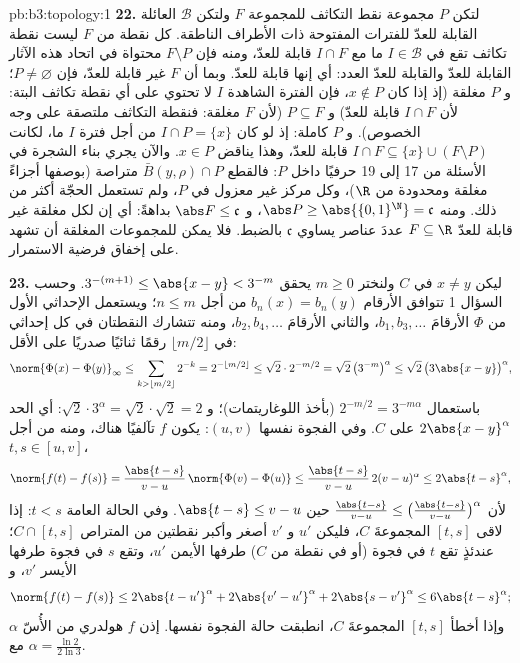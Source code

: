 \begin{solution}{pb:b3:topology:1}
\textbf{22.} لتكن $P$ مجموعة نقط التكاثف للمجموعة $F$ ولتكن
$\mathcal B$ العائلة القابلة للعدّ للفترات المفتوحة ذات الأطراف
الناطقة. كل نقطة من $F$ ليست نقطة تكاثف تقع في $I \in \mathcal B$ ما مع
$I \cap F$ قابلة للعدّ، ومنه فإن $F
\setminus P$ محتواة في اتحاد هذه الآثار
القابلة للعدّ والقابلة للعدّ العدد: أي إنها قابلة للعدّ. وبما أن $F$ غير
قابلة للعدّ، فإن $P \neq \varnothing$؛ و $P$ مغلقة (إذ إذا كان $x \notin P$، فإن
الفترة الشاهدة $I$ لا تحتوي على أي نقطة تكاثف البتة: لأن
$I \cap F$ قابلة للعدّ) و $P \subseteq F$ (لأن $F$ مغلقة: فنقطة
التكاثف ملتصقة على وجه الخصوص). و $P$ كاملة: إذ لو كان $I \cap P = \{x\}$
من أجل فترة $I$ ما، لكانت $I \cap F \subseteq \{x\} \cup (F \setminus P)$ قابلة للعدّ، وهذا يناقض
$x \in P$. والآن يجري بناء الشجرة في الأسئلة من 17 إلى 19
حرفيًا داخل $P$: فالقطع $\bar B(y, \rho) \cap P$ متراصة (بوصفها أجزاءً مغلقة
ومحدودة من $\R$)، وكل مركز غير معزول في $P$، ولم تستعمل الحجّة
أكثر من ذلك. ومنه $\abs P \geq
\abs{\{0,1\}^\N} = \mathfrak c$، و $\abs F \leq \mathfrak
c$ بداهةً: أي إن لكل مغلقة
غير قابلة للعدّ $F \subseteq \R$ عددَ عناصر يساوي $\mathfrak c$
بالضبط. فلا يمكن للمجموعات المغلقة أن تشهد على إخفاق فرضية
الاستمرار.

\textbf{23.} ليكن $x \neq y$ في $C$ ولنختر $m \geq 0$ يحقق
$3^{-(m+1)} \leq \abs{x - y} < 3^{-m}$. وحسب السؤال 1 تتوافق الأرقام $b_n(x) = b_n(y)$ من أجل
$n \leq m$؛ ويستعمل الإحداثي الأول من $\Phi$ الأرقامَ $b_1, b_3, \dots$،
والثاني الأرقامَ $b_2,
b_4, \dots$، ومنه تتشارك النقطتان في كل إحداثي في
$\lfloor m/2\rfloor$ رقمًا ثنائيًا صدريًا على الأقل:
\[
\norm{\Phi(x) - \Phi(y)}_\infty
\leq \sum_{k > \lfloor m/2\rfloor}2^{-k}
= 2^{-\lfloor m/2\rfloor} \leq \sqrt2\cdot2^{-m/2}
= \sqrt2\,\bigl(3^{-m}\bigr)^\alpha
\leq \sqrt2\,\bigl(3\abs{x-y}\bigr)^\alpha,
\]
باستعمال $2^{-m/2} = 3^{-m\alpha}$ (بأخذ اللوغاريتمات)؛ و $\sqrt2\cdot3^\alpha = \sqrt2\cdot\sqrt2 = 2$: أي الحد
$2\abs{x-y}^\alpha$ على $C$. وفي الفجوة نفسها $(u, v)$: يكون $f$ تآلفيًا
هناك، ومنه من أجل $t, s \in [u, v]$،
\[
\norm{f(t) - f(s)} = \frac{\abs{t-s}}{v-u}\,
\norm{\Phi(v) - \Phi(u)}
\leq \frac{\abs{t-s}}{v-u}\,2(v-u)^\alpha
\leq 2\abs{t-s}^\alpha,
\]
لأن $\frac{\abs{t-s}}{v-u} \leq \bigl(\frac{\abs{t-s}}
{v-u}\bigr)^\alpha$ حين $\abs{t-s} \leq v - u$. وفي الحالة العامة $t <
s$: إذا لاقى
$[t, s]$ المجموعةَ $C$، فليكن $u'$ و $v'$ أصغر وأكبر نقطتين من
المتراص $C \cap [t, s]$؛ عندئذٍ تقع $t$ في فجوة (أو في نقطة من
$C$) طرفها الأيمن $u'$، وتقع $s$ في فجوة طرفها الأيسر $v'$، و
\[
\norm{f(t) - f(s)} \leq 2\abs{t - u'}^\alpha
+ 2\abs{v' - u'}^\alpha + 2\abs{s - v'}^\alpha
\leq 6\abs{t - s}^\alpha ;
\]
وإذا أخطأ $[t, s]$ المجموعةَ $C$، انطبقت حالة الفجوة نفسها.
إذن $f$ هولدري من الأُسّ $\alpha$ مع $\alpha = \frac{\ln2}{2\ln3}$.


\end{solution}
